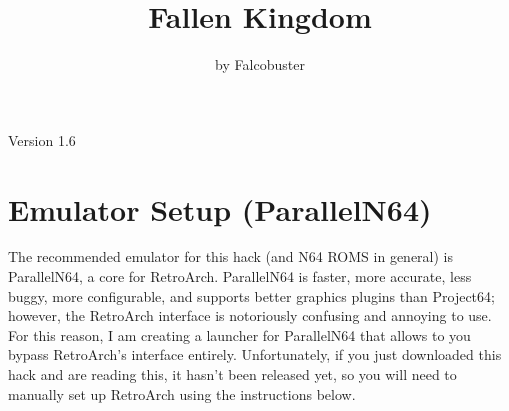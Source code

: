 \documentclass[11pt]{article}
\title{\textbf{Fallen Kingdom}}
\author{by Falcobuster}
\date{}
\begin{document}
\maketitle

Version 1.6

\section{Emulator Setup (ParallelN64)}

The recommended emulator for this hack (and N64 ROMS in general) is ParallelN64, a core for RetroArch. ParallelN64 is faster, more accurate, less buggy, more configurable, and supports better graphics plugins than Project64; however, the RetroArch interface is notoriously confusing and annoying to use. For this reason, I am creating a launcher for ParallelN64 that allows to you bypass RetroArch's interface entirely. Unfortunately, if you just downloaded this hack and are reading this, it hasn't been released yet, so you will need to manually set up RetroArch using the instructions below.
\end{document}
